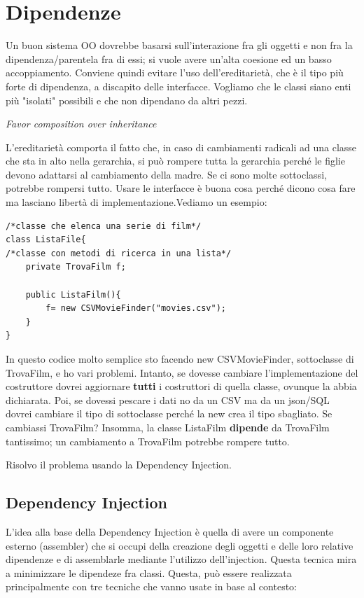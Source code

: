 \section{Dipendenze}
Un buon sistema OO dovrebbe basarsi sull'interazione fra gli oggetti e non fra la dipendenza/parentela fra di essi; si vuole avere un’alta coesione ed un basso accoppiamento. Conviene quindi evitare l'uso dell'ereditarietà, che è il tipo più forte di dipendenza, a discapito delle interfacce.
Vogliamo che le classi siano enti più "isolati" possibili e che non dipendano da altri pezzi.
\begin{center}
\textit{Favor composition over inheritance}
\end{center}
L'ereditarietà comporta il fatto che, in caso di cambiamenti radicali ad una classe che sta in alto nella gerarchia, si può rompere tutta la gerarchia perché le figlie devono adattarsi al cambiamento della madre. Se ci sono molte sottoclassi, potrebbe rompersi tutto. Usare le interfacce è buona cosa perché dicono cosa fare ma lasciano libertà di implementazione.Vediamo un esempio:

\begin{lstlisting}
/*classe che elenca una serie di film*/
class ListaFile{
/*classe con metodi di ricerca in una lista*/
	private TrovaFilm f;

	public ListaFilm(){
		f= new CSVMovieFinder("movies.csv");
	}
}
\end{lstlisting}
In questo codice molto semplice sto facendo new CSVMovieFinder, sottoclasse di TrovaFilm, e ho vari problemi. Intanto, se dovesse cambiare l'implementazione del costruttore dovrei aggiornare \textbf{tutti} i costruttori di quella classe, ovunque la abbia dichiarata. Poi, se dovessi pescare i dati no da un CSV ma da un json/SQL dovrei cambiare il tipo di sottoclasse perché la new crea il tipo sbagliato. Se cambiassi TrovaFilm? Insomma, la classe ListaFilm \textbf{dipende} da TrovaFilm tantissimo; un cambiamento a TrovaFilm potrebbe rompere tutto.

Risolvo il problema usando la Dependency Injection.

\subsection{Dependency Injection}
L'idea alla base della Dependency Injection è quella di avere un componente esterno (assembler) che si occupi della creazione degli oggetti e delle loro relative dipendenze e di assemblarle mediante l’utilizzo dell’injection. Questa tecnica mira a minimizzare le dipendeze fra classi.
Questa, può essere realizzata principalmente con tre tecniche che vanno usate in base al contesto:

